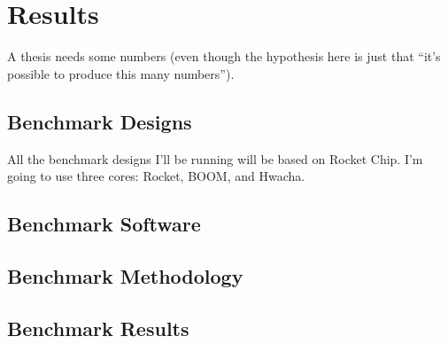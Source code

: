 \documentclass{article}
\begin{document}
\chapter{Results}

A thesis needs some numbers (even though the hypothesis here is just that
``it's possible to produce this many numbers'').

\section{Benchmark Designs}

All the benchmark designs I'll be running will be based on Rocket Chip.  I'm
going to use three cores: Rocket, BOOM, and Hwacha.

\section{Benchmark Software}

\section{Benchmark Methodology}

\section{Benchmark Results}
\end{document}
